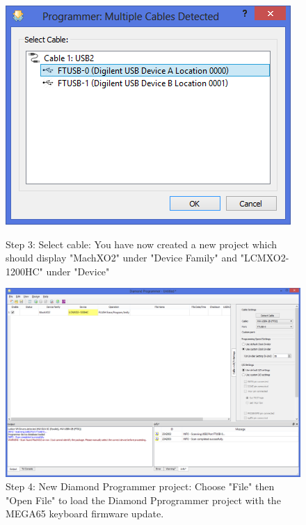 \begin{figure}[H]
  \centering
  \includegraphics[width=0.8\linewidth]{images/diamond03.png}
  \captionsetup{width=0.8\linewidth}
  \caption{Step 3: Select cable:
           You have now created a new project which should display
           "MachXO2" under "Device Family" and "LCMXO2-1200HC" under "Device"}
  \label{fig:diamond03}

\vspace{5mm}

  \includegraphics[width=0.8\linewidth]{images/diamond04.png}
  \captionsetup{width=0.8\linewidth}
  \caption{Step 4: New Diamond Programmer project:
           Choose "File" then "Open File" to load the Diamond Pprogrammer
           project with the MEGA65 keyboard firmware update.}
  \label{fig:diamond04}
\end{figure}


